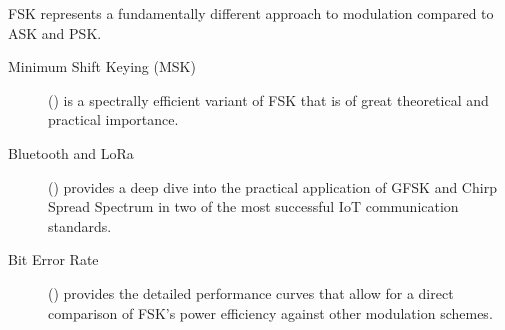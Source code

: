 \begin{importantbox}[title={Further Reading}]
    FSK represents a fundamentally different approach to modulation compared to ASK and PSK.
    \begin{description}
        \item[Minimum Shift Keying (MSK)] () is a spectrally efficient variant of FSK that is of great theoretical and practical importance.
        \item[Bluetooth and LoRa] () provides a deep dive into the practical application of GFSK and Chirp Spread Spectrum in two of the most successful IoT communication standards.
        \item[Bit Error Rate] () provides the detailed performance curves that allow for a direct comparison of FSK's power efficiency against other modulation schemes.
    \end{description}
\end{importantbox}

